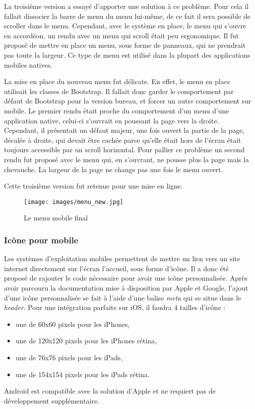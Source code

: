 \documentclass[12pt,a4paper]{article}
\begin{document}
\medskip
La troisième version a essayé d'apporter une solution à ce problème. Pour cela il fallait dissocier la barre de menu du menu lui-même, de ce fait il sera possible de scroller dans le menu. Cependant, avec le système en place, le menu qui s'ouvre en accordéon, un rendu avec un menu qui scroll était peu ergonomique. Il fut proposé de mettre en place un menu, sous forme de panneaux, qui ne prendrait pas toute la largeur. Ce type de menu est utilisé dans la plupart des applications mobiles natives.\par
La mise en place du nouveau menu fut délicate. En effet, le menu en place utilisait les classes de Bootstrap. Il fallait donc garder le comportement par défaut de Bootstrap pour la version bureau, et forcer un autre comportement sur mobile. Le premier rendu était proche du comportement d'un menu d'une application native, celui-ci s'ouvrait en poussant la page vers la droite. Cependant, il présentait un défaut majeur, une fois ouvert la partie de la page, décalée à droite, qui devait être cachée parce qu'elle était hors de l'écran était toujours accessible par un scroll horizontal. Pour pallier ce problème un second rendu fut proposé avec le menu qui, en s'ouvrant, ne pousse plus la page mais la chevauche. La largeur de la page ne change pas une fois le menu ouvert.\par 
Cette troisième version fut retenue pour une mise en ligne.

\begin{figure}[h!]
\centering\texttt{[image: images/menu\_new.jpg]} 
\caption{Le menu mobile final}
\end{figure}

\newpage
\subsubsection{Icône pour mobile}
Les systèmes d'exploitation mobiles permettent de mettre un lien vers un site internet directement sur l'écran l'accueil, sous forme d'icône. Il a donc été proposé de rajouter le code nécessaire pour avoir une icône personnalisée. Après avoir parcouru la documentation mise à disposition par Apple et Google, l'ajout d'une icône personnalisée se fait à l'aide d'une balise \textit{meta} qui se situe dans le \textit{header}. Pour une intégration parfaite sur iOS, il faudra 4 tailles d'icône :
\begin{itemize}
\item une de 60x60 pixels pour les iPhones,
\item une de 120x120 pixels pour les iPhones rétina,
\item une de 76x76 pixels pour les iPads,
\item une de 154x154 pixels pour les iPads rétina.
\end{itemize}
Android est compatible avec la solution d'Apple et ne requiert pas de développement supplémentaire.
\end{document}
